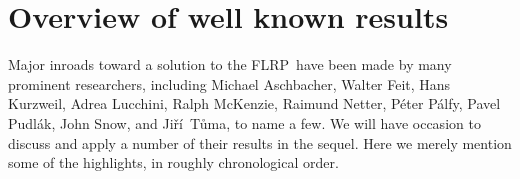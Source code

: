 \documentclass[cm,dissertation]{uhthesis}
\theoremstyle{plain}
\theoremstyle{definition}
\theoremstyle{remark}
\numberwithin{theorem}{section}
\numberwithin{claim}{chapter}
\numberwithin{equation}{section}
\numberwithin{conjecture}{chapter}
\newcommand{\indexTuma}{\index{T\r{u}ma, Ji\v{r}\'i}}
\newcommand{\Jiri}{Ji\v{r}\'i}
\newcommand{\Tuma}{T\r{u}ma}
\newcommand{\Palfy}{P\'alfy}
\newcommand{\Pudlak}{Pudl\'ak}
\newcommand{\<}{\ensuremath{\langle}}
\renewcommand{\>}{\ensuremath{\rangle}}
\newcommand{\FLRP}{{\small FLRP}}
\newcommand{\0}{\ensuremath{\mathbf{0}}}
\newcommand{\1}{\ensuremath{\mathbf{1}}}
\newcommand{\2}{\ensuremath{\mathbf{2}}}
\newcommand{\3}{\ensuremath{\mathbf{3}}}
\newcommand{\4}{\ensuremath{\mathbf{4}}}
\newcommand{\5}{\ensuremath{\mathbf{5}}}
\begin{document}
\section{Overview of well known results}
\label{sec:overv-known-results}
Major inroads toward a solution to the \FLRP\ have been made by many prominent
researchers, including 
%
Michael Aschbacher, 
%
Walter Feit, 
%
Hans Kurzweil, 
%
Adrea Lucchini, 
%
Ralph McKenzie, 
%
Raimund Netter,
%
P\'eter \Palfy,
%
Pavel \Pudlak, 
%
John Snow, and 
\indexTuma%
\Jiri\ \Tuma, to name a few. 
We will have occasion to discuss and apply a number of their results in the
sequel.  Here we merely mention some of the highlights, in roughly chronological
order.  
\end{document}
